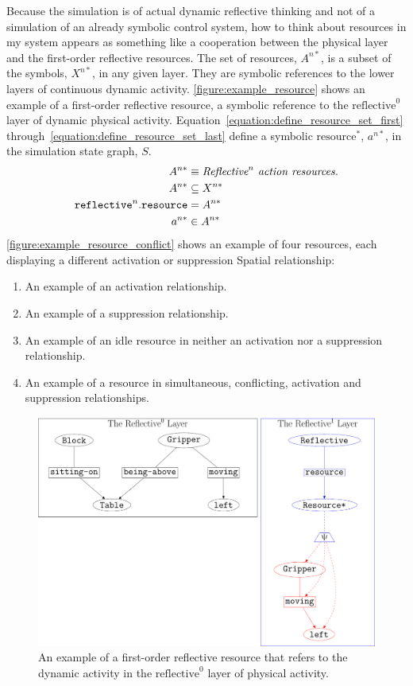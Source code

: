 Because the simulation is of actual dynamic reflective thinking and
not of a simulation of an already symbolic control system, how to
think about resources in my system appears as something like a
cooperation between the physical layer and the first-order reflective
resources.  The set of resources, $A^{n*}$, is a subset of the
symbols, $X^{n*}$, in any given layer.  They are symbolic references
to the lower layers of continuous dynamic activity.
{\mbox{\autoref{figure:example_resource}}} shows an example of a
first-order reflective resource, a symbolic reference to the
$\text{reflective}^0$ layer of dynamic physical activity.
{\mbox{Equation~\ref{equation:define_resource_set_first}}}
{\mbox{through~\ref{equation:define_resource_set_last}}} define a
symbolic $\text{resource}^*$, $a^{n*}$, in the simulation state graph,
$S$.
\begin{align}
\label{equation:define_resource_set_first}
                                       A^{n*} &\equiv \text{\emph{$\text{Reflective}^n$ action resources.}} \\
                                       A^{n*} &\subseteq X^{n*} \\
\text{\tt{reflective}}^n.\text{\tt{resource}} &= A^{n*} \\
\label{equation:define_resource_set_last}
                                       a^{n*} &\in A^{n*}
\end{align}
{\mbox{\autoref{figure:example_resource_conflict}}} shows an example
of four resources, each displaying a different activation or
suppression Spatial relationship:
\begin{enumerate}
\item An example of an activation relationship.
\item An example of a suppression relationship.
\item An example of an idle resource in neither an activation nor a
  suppression relationship.
\item An example of a resource in simultaneous, conflicting,
  activation and suppression relationships.
\end{enumerate}
\begin{figure}
\center
\includegraphics[width=12cm]{gfx/example_resource}
\caption[An example of a first-order reflective resource.]{An example
  of a first-order reflective resource that refers to the dynamic
  activity in the $\text{reflective}^0$ layer of physical activity.}
\label{figure:example_resource}
\end{figure}
